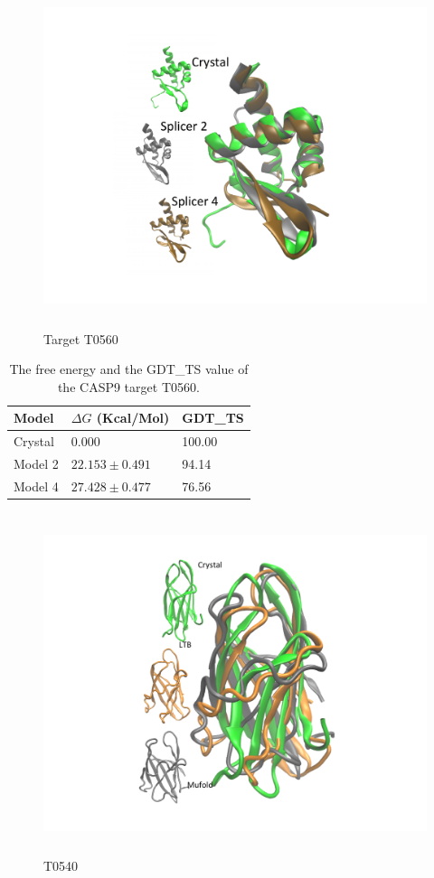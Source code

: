 \documentclass[12pt]{article}
\begin{document}
\begin{figure}
\begin{center}
\includegraphics[width=12cm,height=10cm]{T0560.pdf}
\end{center}
\caption{Target T0560}
\label{fig:T0560}
\end{figure}

\begin{table}
\caption{The free energy and the GDT\_TS value of the CASP9 target T0560.}
\label{tab:T0560}
\begin{center}
\begin{tabular}{l l l}\hline
Model   &     $\Delta G$ (Kcal/Mol) &  GDT\_TS \\ \hline
Crystal &     0.000              & 100.00    \\
Model 2 &     $22.153 \pm 0.491$ &  94.14    \\
Model 4 &     $27.428  \pm 0.477$ &  76.56    \\ \hline
\end{tabular}
\end{center}
\end{table}


\begin{figure}
\begin{center}
\includegraphics[width=12cm,height=10cm]{T0540.pdf}
\end{center}
\caption{T0540}
\label{fig:}
\end{figure}
\end{document}
